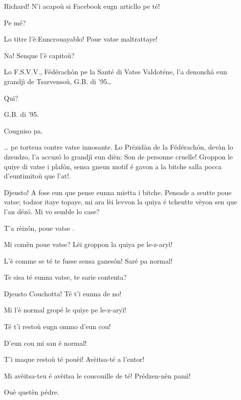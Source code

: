 \begin{drama}


\scene[-- G.B. di '95]

\Saventaspeaks Richard! N'i acapoù si Facebook eugn articllo pe té!

\Richardspeaks Pe mé?

\Saventaspeaks Lo titre l'è:\og Euncrouayablo! Poue vatse maltrattaye\fg!

\Gerominespeaks Na! Senque l'è capitoù?

\Saventaspeaks Lo F.S.V.V., Fédérach\'on pe la Santé di Vatse Valdoténe, l'a denonchà eun grandjì de Tsarvensoù, G.B. di '95\ldots

\Tuenospeaks Qui?

\Saventaspeaks G.B. di '95.

\Tuenospeaks Cougniso pa.

\Saventaspeaks{} \ldots
pe \og torteua contre vatse innosante\fg. 
Lo Prézidàn de la Fédérach\'on, devàn lo dzeudzo, l'a accuz\'o lo grandjì  eun dièn: \og Son de personne cruelle! Groppon le quiye di vatse i plaf\'on, sensa gneun motif é gavon a la bitche salla pocca d'euntimitoù que l'at!\fg.

\Richardspeaks Djeusto! A fose eun que pense eunna mietta i bitche. Pensade a seutte poue vatse; todzor itaye topaye, mi ara lèi levvon la quiya é tcheutte vèyon sen que l'an déz\'o. Mi vo semble lo case?

\Gerominespeaks T'a rèiz\'on, poue vatse \triste.

\Tuenospeaks Mi comèn poue vatse? Lèi groppon la quiya pe le-z-aryì! 

\Richardspeaks L'è comme se té te fusse sensa ganes\'on! Saré pa normal!

\Gerominespeaks{} Te sisa té eunna vatse, te sarie contenta?

\Richardspeaks Djeusto Couchotta! Té t'i eunna de no!

\Tuenospeaks Mi l'è normal gropé le quiye pe le-z-aryì!

\Richardspeaks Té t'i restoù eugn ommo d'eun cou!

\Tuenospeaks D'eun cou mi san é normal!

\Richardspeaks T'i maque restoù té pouèi! Avèitsa-té a l'entor!

\Tuenospeaks Mi avèitsa-teu é avèitsa le coucouille de té! Prédzen-nèn pamì!

\Richardspeaks Ouè quetèn pédre.


\end{drama}
